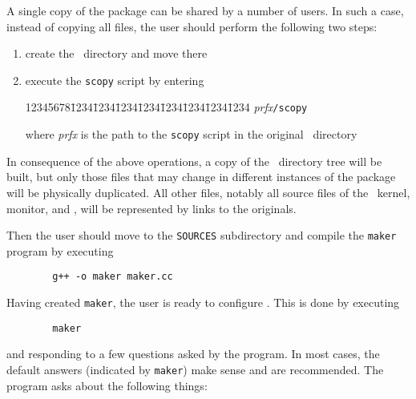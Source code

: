 A single copy of the package can be shared by a number of users.
In such a case, instead of copying all files, the user should perform the
following two steps:

\begin{enumerate}
\item
create the \smurphtt\ directory and move there
\item
execute the {\tt scopy} script by entering
{\tt\begin{tabbing}
12345678\=1234\=1234\=1234\=1234\=1234\=1234\=1234\=1234\kill
\> {\em prfx\/}{\tt /scopy}
\end{tabbing}}
where {\em prfx\/} is the path to the {\tt scopy} script in the original
\smurphtt\ directory
\end{enumerate}

In consequence of the above operations, a copy of the \smurphtt\ directory
tree will be built, but only those files that may change in different
instances of the package will be physically duplicated.
All other files, notably all source files of the \smurph\ kernel,
monitor, and \dsd, will be represented by links to the originals.

Then the user should move to the {\tt SOURCES} subdirectory
and compile the {\tt maker} program by executing
\begin{verbatim}
        g++ -o maker maker.cc
\end{verbatim}

Having created {\tt maker}, the user is ready to configure \smurph.
This is done by executing
\begin{verbatim}
        maker
\end{verbatim}
and responding to a few questions asked by the program.
In most cases, the default answers (indicated by {\tt maker}) make sense
and are recommended.
The program asks about the following things:

